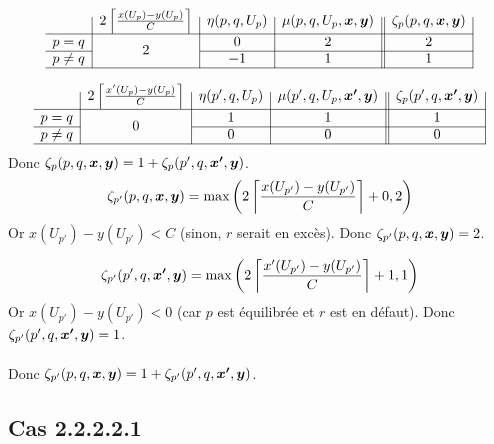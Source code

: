 \begin{gather*}
  \begin{array}{c|c|c|c||c|}
    & 2 \left\lceil \frac{x(U_p)-y(U_p)}{C} \right\rceil
    & \eta(p,q,U_p)
    & \mu(p,q,U_p,\bs{x},\bs{y})
    & \zeta_p(p,q,\bs{x},\bs{y})
    \\ \hline
    p=q
    & \multirow{2}{*}{$2$}
    & 0
    & 2
    & 2
    \\ \cline{1-1}\cline{3-5}
    p \ne q
    &
    & -1
    & 1
    & 1
    \\ \hline
  \end{array}
\end{gather*}

\begin{gather*}
  \begin{array}{c|c|c|c||c|}
    & 2 \left\lceil \frac{x'(U_p)-y(U_p)}{C} \right\rceil
    & \eta(p',q,U_p)
    & \mu(p',q,U_p,\bs{x'},\bs{y})
    & \zeta_p(p',q,\bs{x'},\bs{y})
    \\ \hline
    p=q
    & \multirow{2}{*}{$0$}
    & 1
    & 1
    & 1
    \\ \cline{1-1}\cline{3-5}
    p \ne q
    &
    & 0
    & 0
    & 0
    \\ \hline
  \end{array}
\end{gather*}
Donc $\zeta_p(p,q,\boldsymbol{x},\boldsymbol{y}) = 1 + \zeta_p(p',q,\boldsymbol{x'},\boldsymbol{y})$.
\\

\[\zeta_{p'}(p,q,\boldsymbol{x},\boldsymbol{y}) = \mbox{max}\left(2 \left\lceil \frac{x(U_{p'})-y(U_{p'})}{C} \right\rceil + 0, 2\right)\]
Or $x(U_{p'})-y(U_{p'})<C$ (sinon, $r$ serait en excès).
Donc $\zeta_{p'}(p,q,\boldsymbol{x},\boldsymbol{y}) = 2$.

\[\zeta_{p'}(p',q,\boldsymbol{x'},\boldsymbol{y}) = \mbox{max}\left(2 \left\lceil \frac{x'(U_{p'})-y(U_{p'})}{C} \right\rceil + 1,1\right)\]
Or $x(U_{p'})-y(U_{p'})<0$ (car $p$ est équilibrée et $r$ est en défaut).
Donc $\zeta_{p'}(p',q,\boldsymbol{x'},\boldsymbol{y}) = 1$.
\\
\\
Donc $\zeta_{p'}(p,q,\boldsymbol{x},\boldsymbol{y}) = 1 + \zeta_{p'}(p',q,\boldsymbol{x'},\boldsymbol{y})$.

\subsection*{Cas 2.2.2.2.1}

